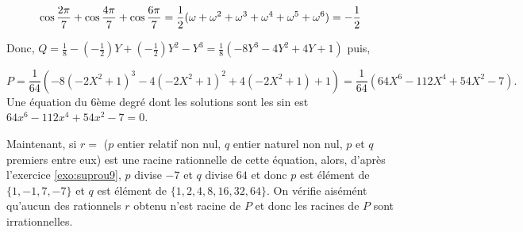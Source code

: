 {{\begin{align*}\ensuremath
\cos\frac{2\pi}{7}+\cos\frac{4\pi}{7}+\cos\frac{6\pi}{7}&=\frac{1}{2}(\omega+\omega^2+\omega^3+\omega^4+\omega^5+\omega^6)=-\frac{1}{2}
\end{align*}

Donc, $Q=\frac{1}{8}-(-\frac{1}{2})Y+(-\frac{1}{2})Y^2-Y^3=\frac{1}{8}(-8Y^3-4Y^2+4Y+1)$ puis,
 
$$P=\frac{1}{64}(-8(-2X^2+1)^3-4(-2X^2+1)^2+4(-2X^2+1)+1)=\frac{1}{64}(64X^6-112X^4+54X^2-7).$$
Une équation du $6$ème degré dont les solutions sont les sin est $64x^6-112x^4+54x^2-7=0$.

Maintenant, si $r=$ ($p$ entier relatif non nul, $q$ entier naturel  non nul, $p$ et $q$ premiers entre eux) est une racine rationnelle de cette équation, alors, d'après l'exercice \ref{exo:suprou9}, $p$ divise $-7$ et $q$ divise $64$ et donc 
$p$ est élément de $\{1,-1,7,-7\}$ et $q$ est élément de $\{1,2,4,8,16,32,64\}$. On vérifie aisémént qu'aucun des rationnels $r$ obtenu n'est racine de $P$ et donc les racines de $P$ sont irrationnelles.
}
}
